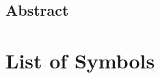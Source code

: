 \documentclass{report}
\begin{document}
\begin{center}
    \newpage \section*{Abstract}    
\end{center}

\newpage \tableofcontents

\newpage \listoffigures

\newpage \listoftables

\newpage \section{List of Symbols}

\end{document}
